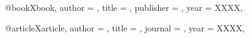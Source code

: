 
@book{Xbook,
    author    = {},
    title     = {},
    publisher = {},
    year      = {XXXX},
}

@article{Xarticle,
    author    = {},
    title     = {},
    journal   = {},
    year      = {XXXX},
}

